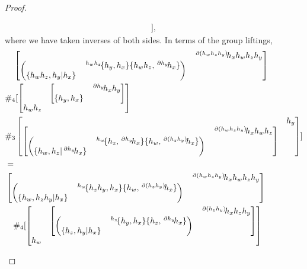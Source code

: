 \documentclass[11pt, reqno]{amsart} %
\newcommand{\act}[1]{\,\sp{#1}\!}
\theoremstyle{definition}
\theoremstyle{remark}
\numberwithin{equation}{section}
\begin{document}
\begin{proof}
\begin{enumerate}
\begin{align*}
    ],
  \end{align*}
  where we have taken inverses of both sides. In terms of the group liftings,
  \begin{align*}
    &\quad 
    \begin{bmatrix}& \act{\partial(h_wh_zh_y)}h_xh_wh_zh_y\\ \begin{pmatrix}& \act{h_wh_z}\{h_y,h_x\}\{h_wh_z,\act{\partial h_y}h_x\}\\ \{h_wh_z,h_y|h_x\}& \end{pmatrix}& \end{bmatrix} \\
    & \#_4
    [
      \begin{bmatrix} &\begin{bmatrix}& \act{\partial h_y}h_xh_y\\ \{h_y,h_x\}&\end{bmatrix}\\ h_wh_z&\end{bmatrix} \\
      & 
      \#_3
      \begin{bmatrix}& h_y\\ \begin{bmatrix}& \act{\partial(h_wh_zh_y)}h_xh_wh_z\\\begin{pmatrix} & \act{h_w}\{h_z,\act{\partial h_y}h_x\}\{h_w,\act{\partial (h_zh_y)}h_x\}\\ \{h_w,h_z|\act{\partial h_y}h_x\}&\end{pmatrix} &\end{bmatrix} & \end{bmatrix}
    ] \\
    &= \\
    &
    \begin{bmatrix}& \act{\partial (h_wh_zh_y)}h_xh_wh_zh_y\\ \begin{pmatrix} & \act{h_w}\{h_zh_y,h_x\}\{h_w,\act{\partial(h_zh_y)}h_x\}\\\{h_w,h_zh_y|h_x\} &\end{pmatrix} &\end{bmatrix} \\
    &\quad \#_4
    [
      \begin{bmatrix} & \begin{bmatrix}& \act{\partial (h_zh_y)}h_xh_zh_y\\ \begin{pmatrix}& \act{h_z}\{h_y,h_x\}\{h_z,\act{\partial h_y}h_x\}\\ \{h_z,h_y|h_x\} &\end{pmatrix}& \end{bmatrix}\\ h_w&\end{bmatrix} \\

\end{align*}
\end{enumerate}
\end{proof}
\end{document}
